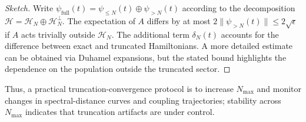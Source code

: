 \documentclass[11pt]{article}
\begin{document}
\begin{proof}[Sketch]
Write $\psi_{\text{full}}(t) = \psi_{\le N}(t) \oplus \psi_{>N}(t)$ according to the decomposition $\mathcal{H} = \mathcal{H}_N\oplus \mathcal{H}_N^{\perp}$. The expectation of $A$ differs by at most $2\|\psi_{>N}(t)\|\le 2\sqrt{\epsilon}$ if $A$ acts trivially outside $\mathcal{H}_N$. The additional term $\delta_N(t)$ accounts for the difference between exact and truncated Hamiltonians. A more detailed estimate can be obtained via Duhamel expansions, but the stated bound highlights the dependence on the population outside the truncated sector.
\end{proof}

Thus, a practical truncation-convergence protocol is to increase $N_{\max}$ and monitor changes in spectral-distance curves and coupling trajectories; stability across $N_{\max}$ indicates that truncation artifacts are under control.


\nocite{*}
  
  
\end{document}

